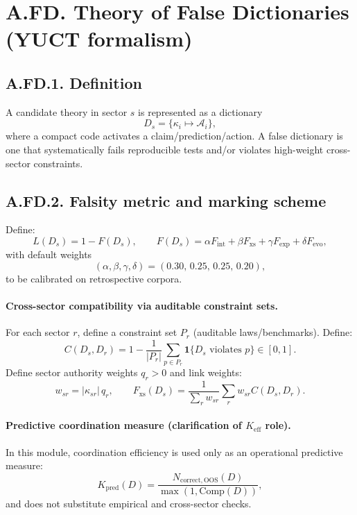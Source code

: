 \documentclass[13pt,a4paper]{article}
\newcommand{\Kpred}{K_{\mathrm{pred}}}
\newcommand{\abs}[1]{\left|#1\right|}
\newcommand{\indicator}{\mathbf{1}}
\begin{document}
	
	\section*{A.FD. Theory of False Dictionaries (YUCT formalism)}
	
	\subsection*{A.FD.1. Definition}
	A candidate theory in sector $s$ is represented as a dictionary
	\[
	D_s=\{\kappa_i\mapsto \mathcal{A}_i\},
	\]
	where a compact code activates a claim/prediction/action. A false dictionary is one that systematically fails reproducible tests and/or violates high-weight cross-sector constraints.
	
	\subsection*{A.FD.2. Falsity metric and marking scheme}
	Define:
	\[
	L(D_s)=1-F(D_s),\qquad
	F(D_s)=\alpha F_{\mathrm{int}}+\beta F_{\mathrm{xs}}+\gamma F_{\mathrm{exp}}+\delta F_{\mathrm{evo}},
	\]
	with default weights
	\[
	(\alpha,\beta,\gamma,\delta)=(0.30,\,0.25,\,0.25,\,0.20),
	\]
	to be calibrated on retrospective corpora.
	
	\paragraph{Cross-sector compatibility via auditable constraint sets.}
	For each sector $r$, define a constraint set $P_r$ (auditable laws/benchmarks). Define:
	\[
	C(D_s,D_r)=1-\frac{1}{|P_r|}\sum_{p\in P_r}\indicator\{D_s\text{ violates }p\}\in[0,1].
	\]
	Define sector authority weights $q_r>0$ and link weights:
	\[
	w_{sr}=\abs{\kappa_{sr}}\,q_r,\qquad
	F_{\mathrm{xs}}(D_s)=\frac{1}{\sum_r w_{sr}}\sum_{r}w_{sr}C(D_s,D_r).
	\]
	
	\paragraph{Predictive coordination measure (clarification of $K_{\mathrm{eff}}$ role).}
	In this module, coordination efficiency is used only as an operational predictive measure:
	\[
	\Kpred(D)=\frac{N_{\mathrm{correct,OOS}}(D)}{\max(1,\mathrm{Comp}(D))},
	\]
	and does not substitute empirical and cross-sector checks.
	
\end{document}
